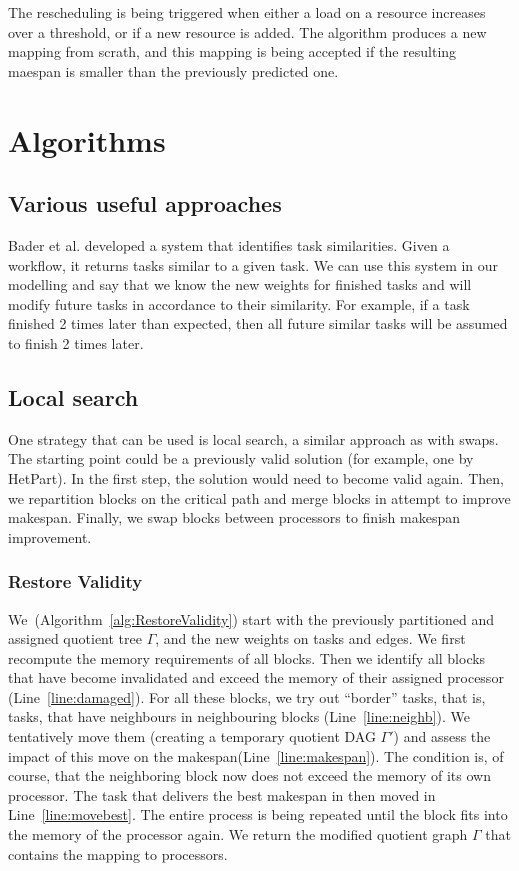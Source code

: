 \documentclass[sigconf,review,anonymous]{acmart}
\begin{document}
    The rescheduling is being triggered when either a load on a resource increases over a threshold, or if a new resource
    is added.
    The algorithm produces a new mapping from scrath, and this mapping is being accepted if the resulting maespan is
    smaller than the previously predicted one.



    \section{Algorithms}

    \subsection{Various useful approaches}

    Bader et al. developed a system that identifies task similarities.
    Given a workflow, it returns tasks similar to a given task.
    We can use this system in our modelling and say that we know the new weights for finished tasks and will modify future tasks in accordance to their similarity.
    For example, if a task finished 2 times later than expected, then all future similar tasks will be assumed to finish 2 times later.

    \subsection{Local search}
    One strategy that can be used is local search, a similar approach as with swaps.
    The starting point could be a previously valid solution (for example, one by HetPart).
    In the first step, the solution would need to become valid again.
    Then, we repartition blocks on the critical path  and merge blocks in attempt to improve makespan.
    Finally, we swap blocks between processors to finish makespan improvement.

    \subsubsection{Restore Validity}
    We~(Algorithm~\ref{alg:RestoreValidity}) start with the previously partitioned and assigned quotient tree $\Gamma$,
    and the new weights on tasks and edges.
    We first recompute the memory requirements of all blocks.
    Then we identify all blocks that have become invalidated and exceed the memory of their assigned processor
    (Line~\ref{line:damaged}).
    For all these blocks, we try out ``border'' tasks, that is, tasks, that have neighbours in neighbouring blocks
    (Line~\ref{line:neighb}).
    We tentatively move them (creating a temporary quotient DAG $\Gamma'$) and assess the impact of this move on the
    makespan(Line~\ref{line:makespan}).
    The condition is, of course, that the neighboring block now does not exceed the memory of its own processor.
    The task that delivers the best makespan in then moved in Line~\ref{line:movebest}.
    The entire process is being repeated until the block fits into the memory of the processor again.
    We return the modified quotient graph $\Gamma$ that contains the mapping to processors.
\end{document}
